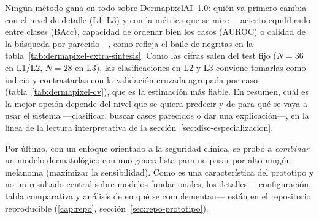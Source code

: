 Ningún método gana en todo sobre DermapixelAI~1.0: quién va primero
cambia con el nivel de detalle (L1--L3) y con la métrica que se mire
---acierto equilibrado entre clases (BAcc), capacidad de ordenar bien los
casos (AUROC) o calidad de la búsqueda por parecido---, como refleja el
baile de negritas en la tabla~\ref{tab:dermapixel-extra-sintesis}. Como
las cifras salen del test fijo ($N = 36$ en L1/L2, $N = 28$ en L3), las
clasificaciones en L2 y L3 conviene tomarlas como indicio y contrastarlas
con la validación cruzada agrupada por caso
(tabla~\ref{tab:dermapixel-cv}), que es la estimación más fiable. En
resumen, cuál es la mejor opción depende del nivel que se quiera predecir
y de para qué se vaya a usar el sistema ---clasificar, buscar casos
parecidos o dar una explicación---, en la línea de la lectura
interpretativa de la sección~\ref{sec:disc-especializacion}.

Por último, con un enfoque orientado a la seguridad clínica, se probó a
\emph{combinar} un modelo dermatológico con uno generalista para no pasar
por alto ningún melanoma (maximizar la sensibilidad). Como es una
característica del prototipo y no un resultado central sobre modelos
fundacionales, los detalles ---configuración, tabla comparativa y
análisis de en qué se complementan--- están en el repositorio
reproducible (\ref{cap:repo}, sección~\ref{sec:repo-prototipo}).
